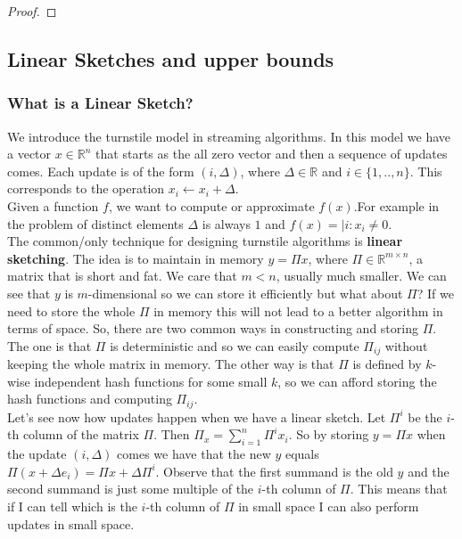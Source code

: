 \documentclass[11pt]{article}
\begin{document}
\begin{proof}
\end{proof}
 
\subsection{Linear Sketches and upper bounds}

\subsubsection{What is a Linear Sketch?}


We introduce the turnstile model in streaming algorithms. In this model we have a vector $x \in \mathbb{R}^n$ that starts as the all zero vector and then a sequence of updates comes. Each update is of the form $(i,\Delta)$, where $\Delta \in \mathbb{R}$ and $i \in \{1,..,n\}$. This corresponds to the operation $x_i \leftarrow x_i + \Delta$.\\
Given a function $f$, we want to compute or approximate $f(x)$.For example in the problem of distinct elements $\Delta$ is always $1$ and $f(x) = | {i: x_i \neq 0}$. \\
The common/only technique for designing turnstile algorithms is \textbf{linear sketching}. The idea is to maintain in memory $y = \Pi x$, where $\Pi \in \mathbb{R}^{m \times n}$, a matrix that is short and fat. We care that $m<n$, usually much smaller. We can see that $y$ is $m$-dimensional so we can store it efficiently but what about $\Pi$? If we need to store the whole $\Pi$ in memory this will not lead to a better algorithm in terms of space. So, there are two common ways in constructing and storing $\Pi$. The one is that $\Pi$ is deterministic and so we can easily compute $\Pi_{ij}$ without keeping the whole matrix in memory. The other way is that $\Pi$ is defined by $k$-wise independent hash functions for some small $k$, so we can afford storing the hash functions and computing $\Pi_{ij}$.	\\

Let's see now how updates happen when we have a linear sketch. Let $\Pi^i$ be the $i$-th column of the matrix $\Pi$. Then $\Pi_x = \sum_{i=1}^n \Pi^i x_i$. So by storing $y = \Pi x$ when the update $(i,\Delta)$ comes we have that the new $y$ equals $\Pi(x+ \Delta e_i) = \Pi x + \Delta \Pi^i$. Observe that the first summand is the old $y$ and the second summand is just some multiple of the $i$-th column of $\Pi$. This means that if I can tell which is the $i$-th column of $\Pi$ in small space I can also perform updates in small space.\\
\end{document}
